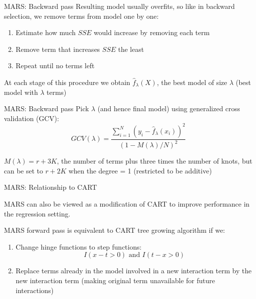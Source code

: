 \documentclass[handout]{beamer}
\begin{document}
\begin{frame}{MARS: Backward pass}
  Resulting model usually overfits, so like in backward selection, we remove terms from model one by one:
  
  \begin{enumerate}
    \item Estimate how much $SSE$ would increase by removing each term
    \item Remove term that increases $SSE$ the least
    \item Repeat until no terms left
  \end{enumerate}
  
  At each stage of this procedure we obtain $\hat{f}_{\lambda}(X)$, the best model of size $\lambda$ (best model with $\lambda$ terms)
\end{frame}

\begin{frame}{MARS: Backward pass}
  Pick $\lambda$ (and hence final model) using generalized cross validation (GCV):
  \begin{equation*}
    GCV(\lambda) =
      \frac{
        \sum_{i = 1}^{N}(y_{i} - \hat{f}_{\lambda}(x_{i}))^2
      }{
        (1 - M(\lambda)/N)^2
      }
  \end{equation*}
  
  $M(\lambda) = r + 3K$, the number of terms plus three times the number of knots, but can be set to $r + 2K$ when the degree = 1 (restricted to be additive)
\end{frame}

\begin{frame}{MARS: Relationship to CART}
  
  MARS can also be viewed as a modification of CART to improve performance in the regression setting.
  
  MARS forward pass is equivalent to CART tree growing algorithm if we:
  \begin{enumerate}
    \item Change hinge functions to step functions:
    \begin{equation*}
      I(x - t > 0) \text{ and } I(t - x > 0)
    \end{equation*}
    \item Replace terms already in the model involved in a new interaction term by the new interaction term (making original term unavailable for future interactions)
  \end{enumerate}
\end{frame}
\end{document}
